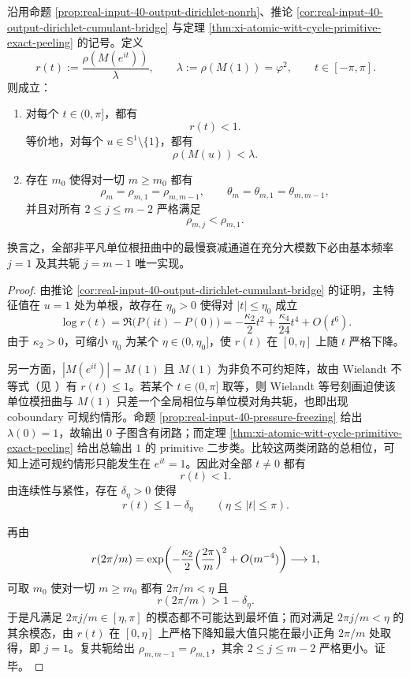 \begin{theorem}[单位圆扭曲谱半径的严格降阶与最坏模态的首模坍缩]\label{thm:xi-output-potential-dirichlet-global-worst-mode-j1}
沿用命题 \ref{prop:real-input-40-output-dirichlet-nonrh}、推论 \ref{cor:real-input-40-output-dirichlet-cumulant-bridge} 与定理 \ref{thm:xi-atomic-witt-cycle-primitive-exact-peeling} 的记号。定义
\[
r(t):=\frac{\rho(M(e^{it}))}{\lambda},
\qquad
\lambda:=\rho(M(1))=\varphi^2,
\qquad
t\in[-\pi,\pi].
\]
则成立：
\begin{enumerate}
  \item 对每个 \(t\in(0,\pi]\)，都有
  \[
  r(t)<1.
  \]
  等价地，对每个 \(u\in \mathbb S^1\setminus\{1\}\)，都有
  \[
  \rho(M(u))<\lambda.
  \]
  \item 存在 \(m_0\) 使得对一切 \(m\ge m_0\) 都有
  \[
  \rho_m=\rho_{m,1}=\rho_{m,m-1},
  \qquad
  \theta_m=\theta_{m,1}=\theta_{m,m-1},
  \]
  并且对所有 \(2\le j\le m-2\) 严格满足
  \[
  \rho_{m,j}<\rho_{m,1}.
  \]
\end{enumerate}
换言之，全部非平凡单位根扭曲中的最慢衰减通道在充分大模数下必由基本频率 \(j=1\) 及其共轭 \(j=m-1\) 唯一实现。
\end{theorem}
\begin{proof}
由推论 \ref{cor:real-input-40-output-dirichlet-cumulant-bridge} 的证明，主特征值在 \(u=1\) 处为单根，故存在 \(\eta_0>0\) 使得对 \(|t|\le \eta_0\) 成立
\[
\log r(t)=\Re\bigl(P(it)-P(0)\bigr)
=-\frac{\kappa_2}{2}t^2+\frac{\kappa_4}{24}t^4+O(t^6).
\]
由于 \(\kappa_2>0\)，可缩小 \(\eta_0\) 为某个 \(\eta\in(0,\eta_0]\)，使 \(r(t)\) 在 \([0,\eta]\) 上随 \(t\) 严格下降。

另一方面，\(|M(e^{it})|=M(1)\) 且 \(M(1)\) 为非负不可约矩阵，故由 Wielandt 不等式（见 \cite{Wielandt1950UnzerlegbareNichtnegative}）有 \(r(t)\le 1\)。若某个 \(t\in(0,\pi]\) 取等，则 Wielandt 等号刻画迫使该单位模扭曲与 \(M(1)\) 只差一个全局相位与单位模对角共轭，也即出现 coboundary 可规约情形。命题 \ref{prop:real-input-40-pressure-freezing} 给出 \(\lambda(0)=1\)，故输出 \(0\) 子图含有闭路；而定理 \ref{thm:xi-atomic-witt-cycle-primitive-exact-peeling} 给出总输出 \(1\) 的 primitive 二步类。比较这两类闭路的总相位，可知上述可规约情形只能发生在 \(e^{it}=1\)。因此对全部 \(t\neq 0\) 都有
\[
r(t)<1.
\]
由连续性与紧性，存在 \(\delta_\eta>0\) 使得
\[
r(t)\le 1-\delta_\eta
\qquad (\eta\le |t|\le \pi).
\]

再由
\[
r(2\pi/m)
=\exp\!\left(
-\frac{\kappa_2}{2}\Bigl(\frac{2\pi}{m}\Bigr)^2
+O(m^{-4})
\right)
\longrightarrow 1,
\]
可取 \(m_0\) 使对一切 \(m\ge m_0\) 都有 \(2\pi/m<\eta\) 且
\[
r(2\pi/m)>1-\delta_\eta.
\]
于是凡满足 \(2\pi j/m\in[\eta,\pi]\) 的模态都不可能达到最坏值；而对满足 \(2\pi j/m<\eta\) 的其余模态，由 \(r(t)\) 在 \([0,\eta]\) 上严格下降知最大值只能在最小正角 \(2\pi/m\) 处取得，即 \(j=1\)。复共轭给出 \(\rho_{m,m-1}=\rho_{m,1}\)，其余 \(2\le j\le m-2\) 严格更小。证毕。
\end{proof}


